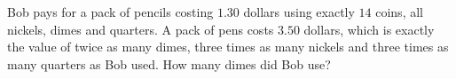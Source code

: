 Bob pays for a pack of pencils costing $1.30$ dollars using exactly $14$ coins, all nickels, dimes and quarters. A pack of pens costs $3.50$ dollars, which is exactly the value of twice as many dimes, three times as many nickels and three times as many quarters as Bob used. How many dimes did Bob use?
